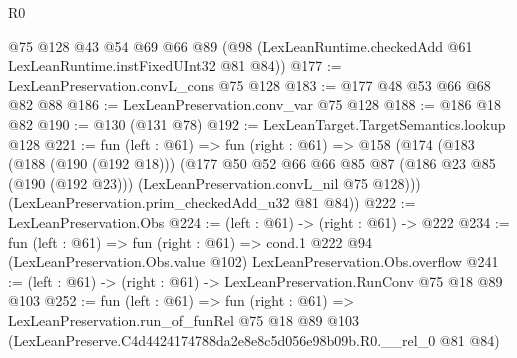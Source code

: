 \begin{lexlean}{R0}
\begin{coremodule}
    @75
    @128
    @43
    @54
    @69
    @66
    @89
    (@98 (LexLeanRuntime.checkedAdd @61 LexLeanRuntime.instFixedUInt32 @81 @84))
@177 := LexLeanPreservation.convL_cons @75 @128
@183 := @177 @48 @53 @66 @68 @82 @88
@186 := LexLeanPreservation.conv_var @75 @128
@188 := @186 @18 @82
@190 := @130 (@131 @78)
@192 := LexLeanTarget.TargetSemantics.lookup @128
@221 := fun (left : @61) =>
  fun (right : @61) =>
  @158
    (@174
      (@183
        (@188 (@190 (@192 @18)))
        (@177
          @50
          @52
          @66
          @66
          @85
          @87
          (@186 @23 @85 (@190 (@192 @23)))
          (LexLeanPreservation.convL_nil @75 @128)))
      (LexLeanPreservation.prim_checkedAdd_u32 @81 @84))
@222 := LexLeanPreservation.Obs
@224 := (left : @61) -> (right : @61) -> @222
@234 := fun (left : @61) =>
  fun (right : @61) =>
  cond.{1} @222 @94 (LexLeanPreservation.Obs.value @102) LexLeanPreservation.Obs.overflow
@241 := (left : @61) -> (right : @61) -> LexLeanPreservation.RunConv @75 @18 @89 @103
@252 := fun (left : @61) =>
  fun (right : @61) =>
  LexLeanPreservation.run_of_funRel
    @75
    @18
    @89
    @103
    (LexLeanPreserve.C4d4424174788da2e8e8c5d056e98b09b.R0.__rel_0 @81 @84)
\end{coremodule}
\end{lexlean}
